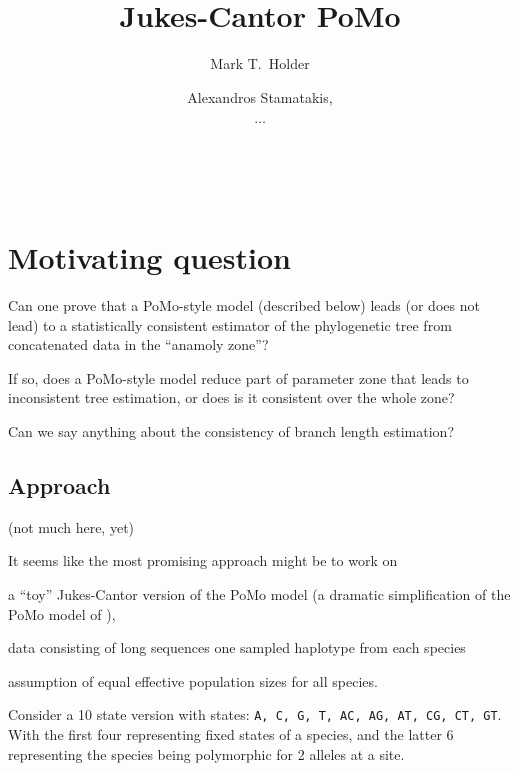 \documentclass{llncs}
\newcommand{\pomo}{PoMo\xspace}
\begin{document}
\title{Jukes-Cantor \pomo}
\author{Mark T.~Holder\and Alexandros Stamatakis, \and $\ldots$}
\\
\newcommand\enum{\addtocounter{equation}{1}\tag{\theequation}}
\maketitle              %
\section {Motivating question}
Can one prove that a \pomo-style model (described below) leads (or does not lead)
to a statistically consistent estimator
of the phylogenetic tree from concatenated data in the ``anamoly zone''?

If so, does a \pomo-style model reduce part of parameter zone that leads to inconsistent
    tree estimation, or does is it consistent over the whole zone?

Can we say anything about the consistency of branch length estimation?

\subsection*{Approach}
(not much here, yet)

It seems like the most promising approach might be to work on
\begin{compactitem}
    \item a ``toy'' Jukes-Cantor version of the \pomo model (a dramatic simplification of the 
    \pomo model of \cite{DeMaioSK2013}),
    \item data consisting of long sequences one sampled haplotype from each species
    \item assumption of equal effective population sizes for all species.
\end{compactitem}

Consider a 10 state version with states: \texttt{A, C, G, T, AC, AG, AT, CG, CT, GT}.
With the first four representing fixed states of a species, and the
latter 6 representing the species being polymorphic for 2 alleles at a site.
\end{document}

